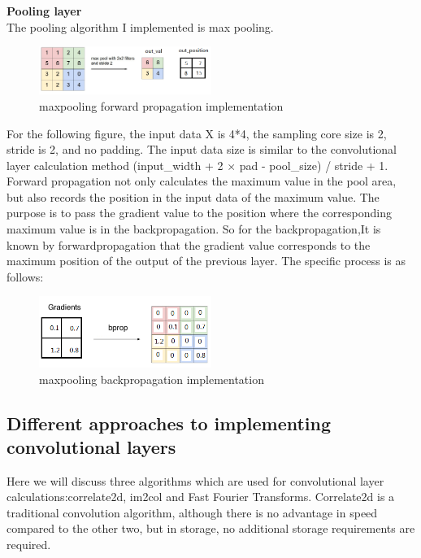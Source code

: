 \documentclass{article}
\begin{document}
\textbf{Pooling layer}\\
The pooling algorithm I implemented is max pooling.
\begin{figure}[H] %
	\centering %
	\includegraphics[width=0.5\textwidth]{./pic/part1/mpImpfprop.png} %
	\caption{maxpooling forward propagation implementation} %
	\label{Fig.main2} %
\end{figure}
For the following figure, the input data X is 4*4, the sampling core size is 2, stride is 2, and no padding. The input data size is similar to the convolutional layer calculation method (input\_width + 2 $\times$ pad - pool\_size) / stride + 1. Forward propagation not only calculates the maximum value in the pool area, but also records the position in the input data of the maximum value. The purpose is to pass the gradient value to the position where the corresponding maximum value is in the backpropagation.
So for the backpropagation,It is known by forwardpropagation that the gradient value corresponds to the maximum position of the output of the previous layer. The specific process is as follows:
\begin{figure}[H] %
	\centering %
	\includegraphics[width=0.5\textwidth]{./pic/part1/mpImpBprop.png} %
	\caption{maxpooling backpropagation implementation} %
	\label{Fig.main2} %
\end{figure}
\subsection{Different approaches to implementing convolutional layers}
Here we will discuss three algorithms which are used for convolutional layer calculations:correlate2d, im2col and Fast Fourier Transforms.
Correlate2d is a traditional convolution algorithm, although there is no advantage in speed compared to the other two, but in storage, no additional storage requirements are required.
\end{document}
